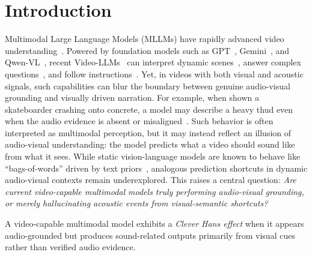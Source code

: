 



\section{Introduction}
\vspace{-0.5em}
Multimodal Large Language Models (MLLMs) have rapidly advanced video understanding~\cite{DBLP:conf/emnlp/LinYZCNJ024, DBLP:conf/acl/0001RKK24, DBLP:journals/tmlr/ZhangWLLMLL25}. Powered by foundation models such as GPT~\cite{DBLP:journals/corr/abs-2601-03267}, Gemini~\cite{deepmind2026gemini3}, and Qwen-VL~\cite{DBLP:journals/corr/abs-2511-21631}, recent Video-LLMs~\cite{DBLP:conf/nips/Dai0LTZW0FH23, zhang-etal-2023-video, Li2023VideoChatCV, DBLP:journals/corr/abs-2504-10479} can interpret dynamic scenes~\cite{Fu2024BLINKML, Ren2024Location}, answer complex questions~\cite{patraucean2023perception,Li2024MVBench}, and follow instructions~\cite{Wang2024InternVideo2SV,jin2023chatunivi}. 
Yet, in videos with both visual and acoustic signals, such capabilities can blur the boundary between genuine audio-visual grounding and visually driven narration. %
For example, when shown a skateboarder crashing onto concrete, a model may describe a heavy thud even when the audio evidence is absent or misaligned~\cite{DBLP:conf/emnlp/LiDZWZW23,DBLP:conf/cvpr/GuanLWXLL0CHYM024,sung-bin2025avhbench,Cai2025DiagnosingAM}.
Such behavior is often interpreted as multimodal perception, but it may instead reflect an illusion of audio-visual understanding: the model predicts what a video should sound like from what it sees. 
While static vision-language models are known to behave like ``bags-of-words'' driven by text priors~\cite{DBLP:conf/cvpr/Tong0Z0LX24, DBLP:conf/cvpr/ThrushJBSWKR22, DBLP:conf/iclr/Yuksekgonul0KJ023}, analogous prediction shortcuts in dynamic audio-visual contexts remain underexplored. This raises a central question: \textit{Are current video-capable multimodal models truly performing audio-visual grounding, or merely hallucinating acoustic events from visual-semantic shortcuts?}

\begin{tcolorbox}[
colback=bluegray!4,
colframe=bluegray!35,
boxrule=0.5pt,
arc=2pt,
left=6pt,
right=6pt,
top=3pt,
bottom=3pt,
title=\textbf{Clever Hans Effect in Audio-Visual Grounding},
fonttitle=\small,
coltitle=black
]
\small
A video-capable multimodal model exhibits a \textit{Clever Hans effect} when it appears audio-grounded but produces sound-related outputs primarily from visual cues rather than verified audio evidence.
\end{tcolorbox}

